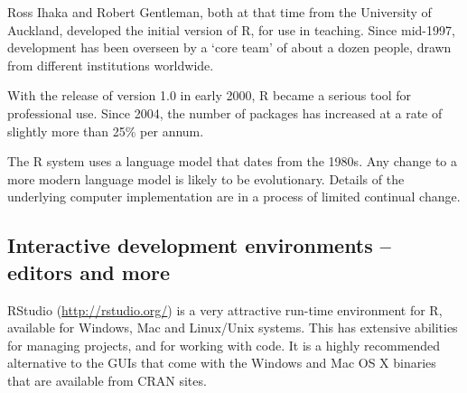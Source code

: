 \documentclass{tufte-book}\usepackage[]{graphicx}\usepackage[]{color}
\begin{document}
Ross Ihaka and Robert Gentleman, both at that time from the University
of Auckland, developed the initial version of R, for use in teaching.
Since mid-1997, development has been overseen by a `core team'
of about a dozen people, drawn from different institutions worldwide.

With the release of version 1.0 in early 2000, R became a serious tool
for professional use.  Since 2004, the number of packages has
increased at a rate of slightly more than 25\% per annum.

The R system uses a language model that dates from the 1980s.
Any change to a more modern language model is likely to be
evolutionary.  Details of the underlying computer implementation
are in a process of limited continual change. 

  \subsection*{Interactive development environments -- editors and more}
    RStudio
  (\url{http://rstudio.org/}) is a very attractive run-time
  environment for R, available for Windows, Mac and Linux/Unix
  systems.  This has extensive abilities for managing projects, and
  for working with code.  It is a highly recommended alternative to
  the GUIs that come with the Windows and Mac OS X binaries that are
  available from CRAN sites.
\end{document}
